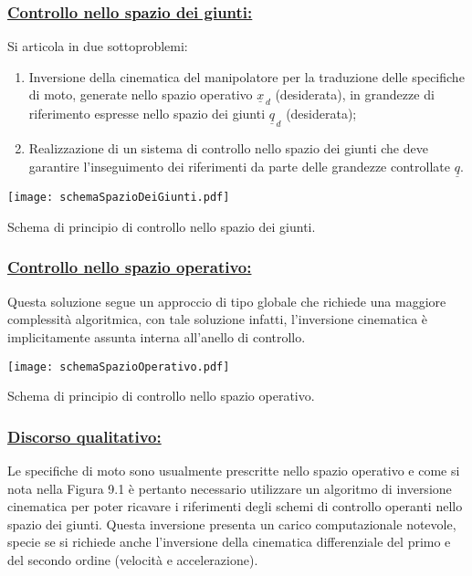 \subsubsection{\underline{Controllo nello spazio dei giunti:}} 
Si articola in due sottoproblemi:
\begin{enumerate}
	\item Inversione della cinematica del manipolatore per la traduzione delle specifiche di moto, generate nello spazio operativo $\underline{x}_{\,d}$ (desiderata), in grandezze di riferimento espresse nello spazio dei giunti $\underline{q}_{\,d}$ (desiderata);
	\item Realizzazione di un sistema di controllo nello spazio dei giunti che deve garantire l'inseguimento dei riferimenti da parte delle grandezze controllate $\underline{q}$.
\end{enumerate}

\begin{center}
	\texttt{[image: schemaSpazioDeiGiunti.pdf]}
	\caption{Schema di principio di controllo nello spazio dei giunti.}
\end{center}

\subsubsection{\underline{Controllo nello spazio operativo:}}
Questa soluzione segue un approccio di tipo globale che richiede una maggiore complessità algoritmica, con tale soluzione infatti, l'inversione cinematica è implicitamente assunta interna all'anello di controllo.

\begin{center}
	\texttt{[image: schemaSpazioOperativo.pdf]}
	\caption{Schema di principio di controllo nello spazio operativo.}
\end{center}

\subsubsection{\underline{Discorso qualitativo:}}
Le specifiche di moto sono usualmente prescritte nello spazio operativo e come si nota nella Figura 9.1 è pertanto necessario utilizzare un algoritmo di inversione cinematica per poter ricavare i riferimenti degli schemi di controllo operanti nello spazio dei giunti. Questa inversione presenta un carico computazionale notevole, specie se si richiede anche l'inversione della cinematica differenziale del primo e del secondo ordine (velocità e accelerazione). 

